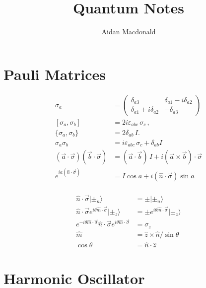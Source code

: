 \documentclass[10pt,a4paper,twocolumn]{article}
\author{Aidan Macdonald}
\title{Quantum Notes}
\begin{document}
\section{Pauli Matrices}

\begin{align*}
\sigma _{a}&={\begin{pmatrix}\delta _{a3}&\delta _{a1}-i\delta _{a2}\\\delta _{a1}+i\delta _{a2}&-\delta _{a3}\end{pmatrix}} \\
[\sigma_a, \sigma_b] &= 2 i \varepsilon_{a b c}\,\sigma_c \, ,  \\
\{\sigma_a, \sigma_b\} &= 2 \delta_{a b}\,I. \\
\sigma _{a}\sigma _{b}&=i\varepsilon _{abc}\,\sigma _{c}+\delta _{ab}I \\
(\vec{a} \cdot \vec{\sigma})(\vec{b} \cdot \vec{\sigma}) &= (\vec{a} \cdot \vec{b}) \, I + i ( \vec{a} \times \vec{b} )\cdot \vec{\sigma} \\
e^{i a(\hat{n} \cdot \vec{\sigma})} &= I\cos{a} + i (\hat{n} \cdot \vec{\sigma}) \sin{a} \, \\
\end{align*}

\begin{align*}
\hat{n} \cdot \vec{\sigma} |\pm_n \rangle &= \pm |\pm_n \rangle \\
\hat{n} \cdot \vec{\sigma} e^{i \theta \hat{m} \cdot \vec{\sigma} }|\pm_z \rangle &= \pm e^{i \theta \hat{m} \cdot \vec{\sigma} } |\pm_z \rangle \\
e^{-i \theta \hat{m} \cdot \vec{\sigma} } \hat{n} \cdot \vec{\sigma} e^{i \theta \hat{m} \cdot \vec{\sigma} } &= \sigma_z \\
\hat{m} &= \hat{z} \times \hat{n}/\sin \theta \\
\cos \theta &= \hat{n} \cdot \hat{z} 
\end{align*}

\section{Harmonic Oscillator}
\end{document}
